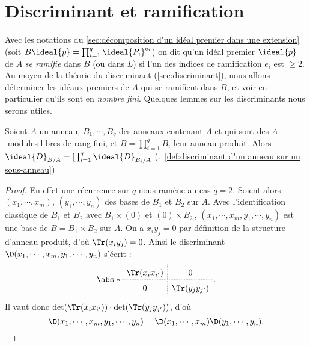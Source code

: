 \documentclass[11pt, useosf,
  title in boldface,
  theorem in new line,
  theorem numbering = section,
  number theorems separately,
]{simplivre}
\begin{document}
\section{Discriminant et ramification}\label{sec:discriminant et ramification}

    Avec les notations du \cref{sec:décomposition d'un idéal premier dans une extension} (soit \( B\ideal{p} = \prod_{i=1}^q \ideal{P_i}^{e_i} \)) on dit qu'un idéal premier \( \ideal{p} \) de \( A \) \emph{se ramifie} dans \( B \) (ou dans \( L \)) si l'un des indices de ramification \( e_i \) est \( \geqslant 2 \). Au moyen de la théorie du discriminant (\cref{sec:discriminant}), nous allons déterminer les idéaux premiers de \( A \) qui se ramifient dans \( B \), et voir en particulier qu'ils sont en \emph{nombre fini}. Quelques lemmes sur les discriminants nous serons utiles.

    \begin{lemma}\label{lem:discriminant de produit et produit de discriminant;idéal}
        Soient \( A \) un anneau, \( B_1, \cdots, B_q \) des anneaux contenant \( A \) et qui sont des \( A \)‑modules libres de rang fini, et \( B = \prod_{i=1}^q B_i \) leur anneau produit. Alors \( \ideal{D}_{B/A} = \prod_{i=1}^q \ideal{D}_{B_i/A} \) (\cf.~\cref{def:discriminant d'un anneau sur un sous-anneau})
    \end{lemma}
    \begin{proof}
        En effet une récurrence sur \( q \) nous ramène au cas \( q = 2 \). Soient alors \( (x_1, \cdots, x_m) \), \( (y_1, \cdots, y_n) \) des bases de \( B_1 \) et \( B_2 \) sur \( A \). Avec l'identification classique de \( B_1 \) et \( B_2 \) avec \( B_1 \times (0) \) et \( (0) \times B_2 \)\,, \( (x_1, \cdots, x_m, y_1, \cdots, y_n) \) est une base de \( B = B_1 \times B_2 \) sur \( A \). On a \( x_i y_j = 0 \) par définition de la structure d'anneau produit, d'où \( \Tr(x_i y_j) = 0 \). Ainsi le discriminant \( \D(x_1, \cdots, x_m, y_1, \cdots, y_n) \) s'écrit :
        \[\def\arraystretch{1.5}
            \abs*{
                \begin{array}{c;{1pt/1pt}c}
                    \Tr(x_i x_{i'}) & 0 \\\hdashline[1pt/1pt]
                    0 & \Tr(y_j y_{j'})
                \end{array}
            }.
        \]
        Il vaut donc \( \det(\Tr(x_i x_{i'})) \cdot \det(\Tr(y_j y_{j'})) \), d'où
        \[
            \D(x_1, \cdots, x_m, y_1, \cdots, y_n) = \D(x_1, \cdots, x_m) \D(y_1, \cdots, y_n).
            \qedhere
        \]
    \end{proof}
\end{document}
